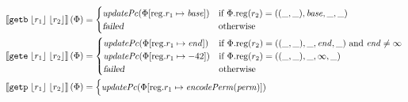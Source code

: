 \documentclass[a4paper]{article}
\newcommand{\update}[2]{[#1 \mapsto #2]}
\newcommand{\sem}[1]{\left\llbracket #1 \right\rrbracket}
\newcommand{\var}[1]{\mathit{#1}}
\newcommand{\start}{\var{base}}
\newcommand{\addrend}{\var{end}}
\newcommand{\inftyend}{-42}
\newcommand{\perm}{\var{perm}}
\newcommand{\plainproj}[1]{\mathrm{#1}}
\newcommand{\memreg}[1][\Phi]{#1.\plainproj{reg}}
\newcommand{\updateReg}[3][\Phi]{#1\update{\plainproj{reg}.#2}{#3}}
\newcommand{\failed}{\textsl{failed}}
\newcommand{\plainfun}[2]{
  \ifthenelse{\equal{#2}{}}
  {\mathit{#1}}
  {\mathit{#1}(#2)}
}
\newcommand{\encodePerm}{\mathit{encodePerm}}
\newcommand{\stdUpdatePc}[1]{\plainfun{updatePc}{#1}}
\newcommand{\refreg}[1]{\lfloor #1 \rfloor}
\newcommand{\zinstr}[1]{\mathtt{#1}}
\newcommand{\twoinstr}[3]{\zinstr{#1} \; #2 \; #3}
\newcommand{\getb}[2]{\twoinstr{getb}{#1}{#2}}
\newcommand{\gete}[2]{\twoinstr{gete}{#1}{#2}}
\newcommand{\getp}[2]{\twoinstr{getp}{#1}{#2}}
\begin{document}
\begin{align*}
  \sem{\getb{\refreg{r_1}}{\refreg{r_2}}}(\Phi) & = 
                                            \begin{cases}
                                              \stdUpdatePc{\updateReg{r_1}{\start}} &
                                              \arraycolsep=0pt
                                              \begin{array}[t]{l}
                                                \text{if $\memreg(r_2) = ((\_,\_),\start,\_,\_)$}
                                              \end{array} \\
                                              \failed & \text{otherwise}
                                            \end{cases}
  \\
  \sem{\gete{\refreg{r_1}}{\refreg{r_2}}}(\Phi) & = 
                                            \begin{cases}
                                              \stdUpdatePc{\updateReg{r_1}{\addrend}} &
                                              \arraycolsep=0pt
                                              \begin{array}[t]{l}
                                                \text{if $\memreg(r_2) = ((\_,\_),\_,\addrend,\_)$ and $\addrend \neq \infty$}
                                              \end{array} \\
                                              \stdUpdatePc{\updateReg{r_1}{\inftyend}} &
                                              \arraycolsep=0pt
                                              \begin{array}[t]{l}
                                                \text{if $\memreg(r_2) = ((\_,\_),\_,\infty,\_)$}
                                              \end{array} \\
                                              \failed & \text{otherwise}
                                            \end{cases}
  \\
  \sem{\getp{\refreg{r_1}}{\refreg{r_2}}}(\Phi) & = 
                                            \begin{cases}
                                              \stdUpdatePc{\updateReg{r_1}{\encodePerm(\perm)}} &
                                              \arraycolsep=0pt
                                              \begin{array}[t]{l}

\end{array}
\end{cases}
\end{align*}
\end{document}

